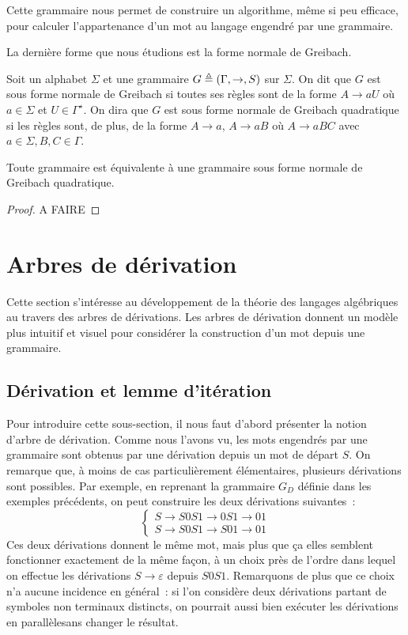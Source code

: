 \begin{remark}
  Cette grammaire nous permet de construire un algorithme, même si peu efficace,
  pour calculer l'appartenance d'un mot au langage engendré par une grammaire.
\end{remark}

La dernière forme que nous étudions est la forme normale de Greibach.

\begin{definition}
  Soit un alphabet $\Sigma$ et une grammaire $G \triangleq (\Gamma,\to,S)$ sur
  $\Sigma$.
  On dit que $G$ est sous forme normale de Greibach si toutes ses règles sont
  de la forme $A \to aU$ où $a \in \Sigma$ et $U \in \Gamma^\star$. On dira que
  $G$ est sous forme normale de Greibach quadratique si les règles sont, de
  plus, de la forme $A \to a$, $A \to aB$ où $A \to aBC$ avec
  $a\in\Sigma, B,C \in \Gamma$.
\end{definition}

\begin{proposition}
  Toute grammaire est équivalente à une grammaire sous forme normale de Greibach
  quadratique.
\end{proposition}

\begin{proof}
  A FAIRE
\end{proof}

\section{Arbres de dérivation}

Cette section s'intéresse au développement de la théorie des langages
algébriques au travers des arbres de dérivations. Les
arbres de dérivation donnent un modèle plus intuitif et visuel pour considérer
la construction d'un mot depuis une grammaire.

\subsection{Dérivation et lemme d'itération}

Pour introduire cette sous-section, il nous faut d'abord présenter la notion
d'arbre de dérivation. Comme nous l'avons vu, les mots engendrés par une
grammaire sont obtenus par une dérivation depuis un mot de départ $S$. On
remarque que, à moins de cas particulièrement élémentaires, plusieurs
dérivations sont possibles. Par exemple, en reprenant la grammaire $G_D$
définie dans les exemples précédents, on peut construire les deux dérivations
suivantes~:
\[\begin{cases}
S \to S0S1 \to 0S1 \to 01\\
S \to S0S1 \to S01 \to 01
\end{cases}\]
Ces deux dérivations donnent le même mot, mais plus que ça elles semblent
fonctionner exactement de la même façon, à un choix près de l'ordre dans
lequel on effectue les dérivations $S \to \varepsilon$ depuis $S0S1$. Remarquons
de plus que ce choix n'a aucune incidence en général~: si l'on considère deux
dérivations partant de symboles non terminaux distincts, on pourrait aussi bien
exécuter les dérivations \og en parallèle\fg sans changer le résultat.


